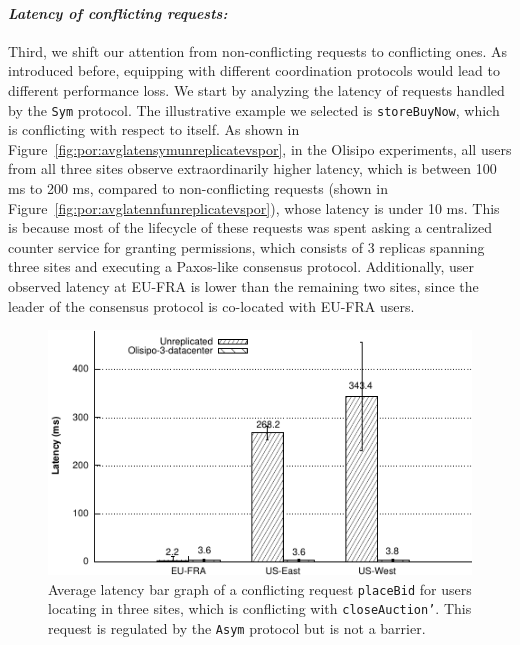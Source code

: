 \paragraph{{\em Latency of conflicting requests: }} Third, we shift our attention from non-conflicting requests
to conflicting ones. As introduced before, equipping with different coordination 
protocols would lead to different performance loss. We start by analyzing the latency of 
requests handled by the {\tt Sym} protocol. The illustrative example we selected 
is {\tt storeBuyNow}, which is conflicting with respect to itself. As shown in 
Figure~\ref{fig:por:avglatensymunreplicatevspor}, in the Olisipo experiments, all users 
from all three sites observe extraordinarily higher latency, which is between 100 ms to 200 ms, compared
to non-conflicting requests (shown in Figure~\ref{fig:por:avglatennfunreplicatevspor}), 
whose latency is under 10 ms. This is because most of the lifecycle of these
requests was spent asking a centralized counter service for granting permissions, which
consists of 3 replicas spanning three sites and executing a Paxos-like consensus protocol. 
Additionally, user observed latency at EU-FRA is lower than
the remaining two sites, since the leader of the consensus protocol is co-located
with EU-FRA users. 

\begin{figure}[t!]
  \centering
\includegraphics[width=0.85\columnwidth]{figures/por/eval/avg_latency_asym_placebid_unreplicated_vs_por.pdf}
  \caption{Average latency bar graph of a conflicting request {\tt placeBid} for
  users locating in three sites, which is conflicting with {\tt closeAuction'}. This request
  is regulated by the {\tt Asym} protocol but is not a barrier.}
 \label{fig:por:avglatenasymnbunreplicatevspor}
\end{figure}

